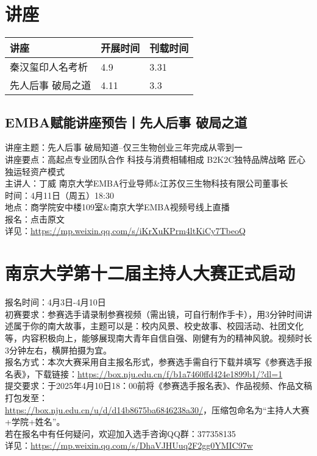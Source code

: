 \documentclass[letterpaper, 12pt]{article}
\begin{document}
\begin{multicols}{2}
\pagebreak

\section{讲座}
\begin{tabular}{|>{\centering\arraybackslash}m{}|m{}|m{}|}
    \hline
    讲座 & 开展时间 & 刊载时间\\
    \hline\hline
    秦汉玺印人名考析 & 4.9 & 3.31\\\hline
    先人后事 破局之道 & 4.11 & 3.3\\\hline
\end{tabular}

\subsection{EMBA赋能讲座预告丨先人后事 破局之道}
讲座主题：先人后事 破局知道--仅三生物创业三年完成从零到一
\\讲座要点：高起点专业团队合作 科技与消费相辅相成 B2K2C独特品牌战略 匠心独运轻资产模式
\\主讲人：丁威 南京大学EMBA行业导师\&江苏仅三生物科技有限公司董事长
\\时间：4月11日（周五）18:30
\\地点：商学院安中楼109室\&南京大学EMBA视频号线上直播
\\报名：点击原文
\\详见：\url{https://mp.weixin.qq.com/s/iKrXuKPrm4ltKiCy7TbeoQ}


\section{南京大学第十二届主持人大赛正式启动}
报名时间：4月3日-4月10日
\\初赛要求：参赛选手请录制参赛视频（需出镜，可自行制作手卡），用3分钟时间讲述属于你的南大故事，主题可以是：校内风景、校史故事、校园活动、社团文化等，内容积极向上，能够展现南大青年自信自强、刚健有为的精神风貌。视频时长3分钟左右，横屏拍摄为宜。
\\报名方式：本次大赛采用自主报名形式，参赛选手需自行下载并填写《参赛选手报名表》，下载链接：\url{https://box.nju.edu.cn/f/b1a7460ffd424e1899b1/?dl=1}
\\提交要求：于2025年4月10日18：00前将《参赛选手报名表》、作品视频、作品文稿打包发至：
\\\url{https://box.nju.edu.cn/u/d/d14b8675ba6846238a30/}，压缩包命名为“主持人大赛+学院+姓名”。
\\若在报名中有任何疑问，欢迎加入选手咨询QQ群：377358135
\\详见：\url{https://mp.weixin.qq.com/s/DhaVJHUuq2F2gg0YMIC97w}


\end{multicols}
\end{document}
